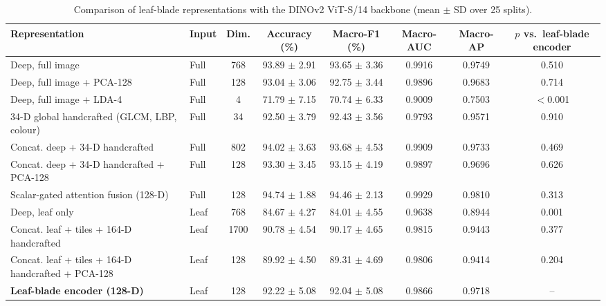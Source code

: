 \begin{table}[tbp]
\centering
\footnotesize
\caption{Comparison of leaf-blade representations with the DINOv2 ViT-S/14 backbone (mean $\pm$ SD over 25 splits).}
\label{tab:compare_dinov2_s}
\begin{adjustbox}{max width=\textwidth}
\begin{tabular}{llcccccc}
\toprule
Representation & Input & Dim. & Accuracy (\%) & Macro-F1 (\%) & Macro-AUC & Macro-AP & $p$ vs.\ leaf-blade encoder \\
\midrule
Deep, full image & Full & 768 & 93.89 $\pm$ 2.91 & 93.65 $\pm$ 3.36 & 0.9916 & 0.9749 & 0.510 \\
Deep, full image + PCA-128 & Full & 128 & 93.04 $\pm$ 3.06 & 92.75 $\pm$ 3.44 & 0.9896 & 0.9683 & 0.714 \\
Deep, full image + LDA-4 & Full & 4 & 71.79 $\pm$ 7.15 & 70.74 $\pm$ 6.33 & 0.9009 & 0.7503 & $<$0.001 \\
34-D global handcrafted (GLCM, LBP, colour) & Full & 34 & 92.50 $\pm$ 3.79 & 92.43 $\pm$ 3.56 & 0.9793 & 0.9571 & 0.910 \\
Concat. deep + 34-D handcrafted & Full & 802 & 94.02 $\pm$ 3.63 & 93.68 $\pm$ 4.53 & 0.9909 & 0.9733 & 0.469 \\
Concat. deep + 34-D handcrafted + PCA-128 & Full & 128 & 93.30 $\pm$ 3.45 & 93.15 $\pm$ 4.19 & 0.9897 & 0.9696 & 0.626 \\
Scalar-gated attention fusion (128-D) & Full & 128 & 94.74 $\pm$ 1.88 & 94.46 $\pm$ 2.13 & 0.9929 & 0.9810 & 0.313 \\
\midrule
Deep, leaf only & Leaf & 768 & 84.67 $\pm$ 4.27 & 84.01 $\pm$ 4.55 & 0.9638 & 0.8944 & 0.001 \\
Concat. leaf + tiles + 164-D handcrafted & Leaf & 1700 & 90.78 $\pm$ 4.54 & 90.17 $\pm$ 4.65 & 0.9815 & 0.9443 & 0.377 \\
Concat. leaf + tiles + 164-D handcrafted + PCA-128 & Leaf & 128 & 89.92 $\pm$ 4.50 & 89.31 $\pm$ 4.69 & 0.9806 & 0.9414 & 0.204 \\
\textbf{Leaf-blade encoder (128-D)} & Leaf & 128 & 92.22 $\pm$ 5.08 & 92.04 $\pm$ 5.08 & 0.9866 & 0.9718 & -- \\
\bottomrule
\end{tabular}
\end{adjustbox}
\end{table}
